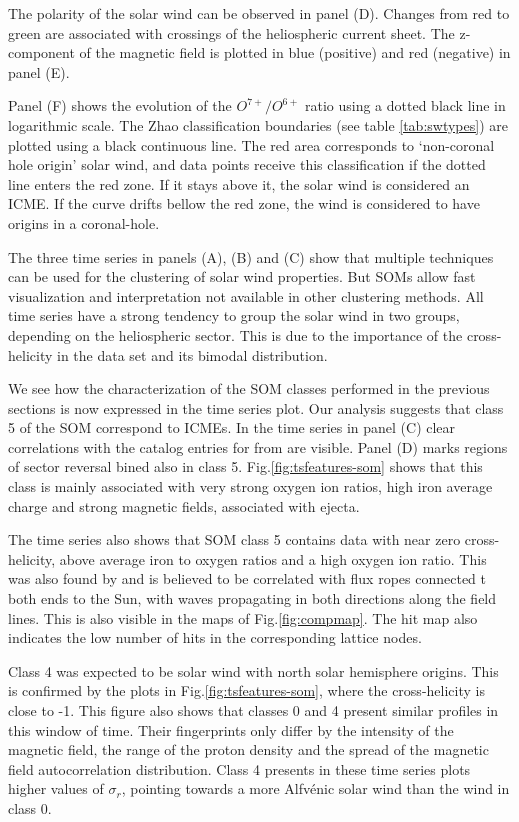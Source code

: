 The polarity of the solar wind can be observed in panel (D). Changes from red to green are associated with crossings of the heliospheric current sheet. The z-component of the magnetic field is plotted in blue (positive) and red (negative) in panel (E).

Panel (F) shows the evolution of the $O^{7+}/O^{6+}$ ratio using a dotted black line in logarithmic scale. The Zhao classification boundaries (see table \ref{tab:swtypes}) are plotted using a black continuous line. The red area corresponds to `non-coronal hole origin' solar wind, and data points receive this classification if the dotted line enters the red zone. If it stays above it, the solar wind is considered an ICME. If the curve drifts bellow the red zone, the wind is considered to have origins in a coronal-hole.

The three time series in panels (A), (B) and (C) show that multiple techniques can be used for the clustering of solar wind properties. But SOMs allow fast visualization and interpretation not available in other clustering methods. All time series have a strong tendency to group the solar wind in two groups, depending on the heliospheric sector. This is due to the importance of the cross-helicity in the data set and its bimodal distribution.

We see how the characterization of the SOM classes performed in the previous sections is now expressed in the time series plot. Our analysis suggests that class 5 of the SOM correspond to ICMEs. In the time series in panel (C) clear correlations with the catalog entries for from \citep{Richardson2012} are visible. Panel (D) marks regions of sector reversal bined also in class 5. Fig.\ref{fig:tsfeatures-som} shows that this class is mainly associated with very strong oxygen ion ratios, high iron average charge and strong magnetic fields, associated with ejecta.

The time series also shows that SOM class 5 contains data with near zero cross-helicity, above average iron to oxygen ratios and a high oxygen ion ratio. This was also found by \citep{Roberts2020} and is believed to be correlated with flux ropes connected t both ends to the Sun, with waves propagating in both directions along the field lines. This is also visible in the maps of Fig.\ref{fig:compmap}. The hit map also indicates the low number of hits in the corresponding lattice nodes.

Class 4 was expected to be solar wind with north solar hemisphere origins. This is confirmed by the plots in Fig.\ref{fig:tsfeatures-som}, where the cross-helicity is close to -1. This figure also shows that classes 0 and 4 present similar profiles in this window of time. Their fingerprints only differ by the intensity of the magnetic field, the range of the proton density and the spread of the magnetic field autocorrelation distribution. Class 4 presents in these time series plots higher values of $\sigma_r$, pointing towards a more Alfv\'enic solar wind than the wind in class 0.

